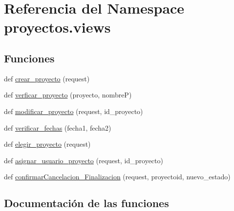 \hypertarget{namespaceproyectos_1_1views}{}\section{Referencia del Namespace proyectos.\+views}
\label{namespaceproyectos_1_1views}
\subsection*{Funciones}
\begin{DoxyCompactItemize}
\item 
def \hyperlink{namespaceproyectos_1_1views_a765cbc076a4274090478bc163cfc8095}{crear\+\_\+proyecto} (request)
\item 
def \hyperlink{namespaceproyectos_1_1views_a4884cd1394ee28c430713e6b13aa3581}{verficar\+\_\+proyecto} (proyecto, nombreP)
\item 
def \hyperlink{namespaceproyectos_1_1views_ad0ef095351879a9e1ae0e9935f71f8e5}{modificar\+\_\+proyecto} (request, id\+\_\+proyecto)
\item 
def \hyperlink{namespaceproyectos_1_1views_aa4d5795a548d68332028c6c591deeab8}{verificar\+\_\+fechas} (fecha1, fecha2)
\item 
def \hyperlink{namespaceproyectos_1_1views_ab3771b7dcba09e6c5ba0b8e6c80cfb01}{elegir\+\_\+proyecto} (request)
\item 
def \hyperlink{namespaceproyectos_1_1views_a8431d835171e6b972d99adbf4d3f7ac2}{asignar\+\_\+usuario\+\_\+proyecto} (request, id\+\_\+proyecto)
\item 
def \hyperlink{namespaceproyectos_1_1views_a12087e5e355f36cbd477c2e550b26395}{confirmar\+Cancelacion\+\_\+\+Finalizacion} (request, proyectoid, nuevo\+\_\+estado)
\end{DoxyCompactItemize}


\subsection{Documentación de las funciones}
